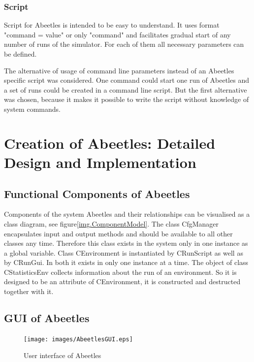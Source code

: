 \documentclass[a4paper,12pt]{report}
\begin{document}
  
\subsection {Script}

Script for Abeetles is intended to be easy to understand. It uses format
"command = value" or only "command" and facilitates gradual start of any number of runs of the simulator. For each of them all necessary parameters can be defined.

The alternative of usage of command line parameters instead of an Abeetles specific script was considered. One command could start one run of Abeetles and a set of runs could be created in a command line script. But the first alternative was chosen, because it makes it possible to write the script without knowledge of system commands.


\chapter{Creation of Abeetles: Detailed Design and Implementation}


\section{Functional Components of Abeetles}
Components of the system Abeetles and their relationships can be visualised as a class diagram, see figure\ref{img.ComponentModel}. The class CfgManager encapsulates input and output methods and should be available to all other classes any time. Therefore this class exists in the system only in one instance as a global variable. Class CEnvironment is instantiated by CRunScript as well as by CRunGui. In both it exists in only one instance at a time. The object of class CStatisticsEnv collects information about the run of an environment. So it is designed to be an attribute of CEnvironment, it is constructed and destructed together with it.


\section {GUI of Abeetles}
\begin{figure}
\begin{center}
  \texttt{[image: images/AbeetlesGUI.eps]}
  \caption{User interface of Abeetles}
  \label{img.AbeetlesGUI}
\end{center}
\end{figure}
\end{document}
